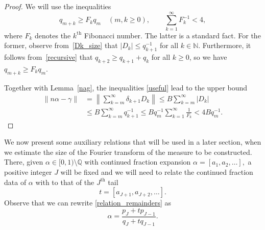 \documentclass[12pt, reqno]{amsart}
\theoremstyle{definition}
\theoremstyle{remark}
\numberwithin{equation}{section}
\def\alp{{\alpha}} \def\bfalp{{\boldsymbol \alpha}}
\def\gam{{\gamma}} \def\Gam{{\Gamma}}
\def\leq{\leqslant}
\def\geq{\geqslant}
\def \bN {\mathbb N}
\def \bQ {\mathbb Q}
\begin{document}
	\begin{proof} We will use the inequalities
		\begin{equation} \label{useful}
			q_{m+k} \ge F_k q_m \quad (m, k \ge 0),
			\qquad \sum_{k=1}^\infty F_k^{-1} < 4,
		\end{equation}
		where $F_k$ denotes the $k^{\mathrm{th}}$ Fibonacci number.
		The latter is a standard fact. For the former, observe from~\eqref{Dk_size} that $|D_k|\leq q_{k+1}^{-1}$ for all $k\in\bN$. Furthermore, it follows from~\eqref{recursive} that $q_{k+2}\geq q_{k+1}+q_k$ for all $k \ge 0$, so we have $q_{m+k} \ge F_k q_m$.  
		
		Together with Lemma~\ref{nag}, the inequalities \eqref{useful} lead to the upper bound
		\[ \begin{aligned}
			\|n\alp-\gam\| & = \left\|\sum_{k=m}^{\infty}\delta_{k+1}D_k\right\|\leq B\sum_{k=m}^{\infty}|D_k|\\
			&\leq B\sum_{k=m}^{\infty}q_{k+1}^{-1}\leq Bq_m^{-1}\sum_{k=1}^{\infty}\frac{1}{F_k}
			< 4Bq_m^{-1}.
		\end{aligned}
		\]
	\end{proof}
	
	We now present some auxiliary relations that will be used in a later section, when we estimate the size of the Fourier transform of the measure to be constructed. There, given $\alp \in [0,1)\setminus \bQ $ with continued fraction expansion $\alp = [a_1, a_2, \ldots],$ a positive integer $J$ will be fixed and we will need to relate the continued fraction data of $\alp$ with to that of the $J^{\mathrm{th}}$ tail 
	\[ t = 
	[a_{J+1}, a_{J+2}, \ldots]. 
	\] 
	Observe that we can rewrite \eqref{relation_remainders} as
	\begin{equation}
		\alp = \frac{p_J + t p_{J-1}} {q_J + tq_{J-1}}\label{alphaoft}. 
	\end{equation}
	
\end{document}
